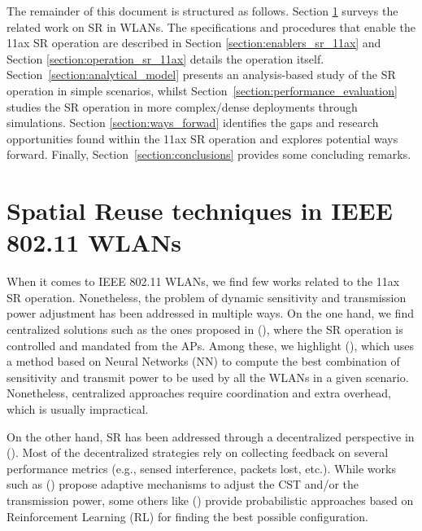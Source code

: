 \documentclass[preprint,12pt]{elsarticle}
\begin{document}
	The remainder of this document is structured as follows. Section \ref{section:previous_work_sr} surveys the related work on SR in WLANs. The specifications and procedures that enable the 11ax SR operation are described in Section \ref{section:enablers_sr_11ax} and Section \ref{section:operation_sr_11ax} details the operation itself. Section~\ref{section:analytical_model} presents an analysis-based study of the SR operation in simple scenarios, whilst Section~\ref{section:performance_evaluation} studies the SR operation in more complex/dense deployments through simulations. Section \ref{section:ways_forwad} identifies the gaps and research opportunities found within the 11ax SR operation and explores potential ways forward. Finally, Section~\ref{section:conclusions} provides some concluding remarks.
	
	\section{Spatial Reuse techniques in IEEE 802.11 WLANs}%
	\label{section:previous_work_sr}
	
	When it comes to IEEE 802.11 WLANs, we find few works related to the 11ax SR operation. Nonetheless, the problem of dynamic sensitivity and transmission power adjustment has been addressed in multiple ways. On the one hand, we find centralized solutions such as the ones proposed in (\citealp{li2011achieving, jamil2016novel, nakahira2014centralized}), where the SR operation is controlled and mandated from the APs. Among these, we highlight (\citealp{jamil2016novel}), which uses a method based on Neural Networks (NN) to compute the best combination of sensitivity and transmit power to be used by all the WLANs in a given scenario. Nonetheless, centralized approaches require coordination and extra overhead, which is usually impractical.
	
	On the other hand, SR has been addressed through a decentralized perspective in (\citealp{chevillat2005dynamic, tang2011improving, chau2017effective, wilhelmi2019collaborative, wilhelmi2019potential}). Most of the decentralized strategies rely on collecting feedback on several performance metrics (e.g., sensed interference, packets lost, etc.). While works such as (\citealp{chevillat2005dynamic, tang2011improving, chau2017effective}) propose adaptive mechanisms to adjust the CST and/or the transmission power, some others like (\citealp{wilhelmi2019collaborative, wilhelmi2019potential}) provide probabilistic approaches based on Reinforcement Learning (RL) for finding the best possible configuration.
	
\end{document}
